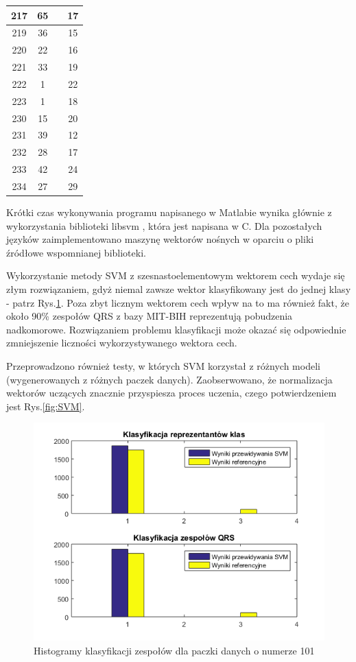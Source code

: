 \begin{table}[!tp]
\begin{tabular}{|c|c|c|c|}
		217 & 65 &  & 17\\ \hline
		219 & 36 &  & 15\\ \hline
		220 & 22 &  & 16\\ \hline	
		221 & 33 &  & 19\\ \hline
		222 &  1 &  & 22\\ \hline
		223 &  1 &  & 18\\ \hline
		230 & 15 &  & 20\\ \hline
		231 & 39 &  & 12\\ \hline
		232 & 28 &  & 17\\ \hline
		233 & 42 &  & 24\\ \hline
		234 & 27 &  & 29\\ \hline
	\end{tabular}
\end{table}

Krótki czas wykonywania programu napisanego w Matlabie wynika głównie z wykorzystania biblioteki libsvm \cite{csie}, która jest napisana w C. Dla pozostałych języków zaimplementowano maszynę wektorów nośnych w oparciu o pliki źródłowe wspomnianej biblioteki.

Wykorzystanie metody SVM z szesnastoelementowym wektorem cech wydaje się złym rozwiązaniem, gdyż niemal zawsze wektor klasyfikowany jest do jednej klasy - patrz Rys.\ref{fig:hist1}. Poza zbyt licznym wektorem cech wpływ na to ma również fakt, że około 90\% zespołów QRS z bazy MIT-BIH reprezentują pobudzenia nadkomorowe. Rozwiązaniem problemu klasyfikacji może okazać się odpowiednie zmniejszenie liczności wykorzystywanego wektora cech.

Przeprowadzono również testy, w których SVM korzystał z różnych modeli (wygenerowanych z różnych paczek danych). Zaobserwowano, że normalizacja wektorów uczących znacznie przyspiesza proces uczenia, czego potwierdzeniem jest Rys.\ref{fig:SVM}.

\begin{figure}[!htp]
	\centering
	\includegraphics[width=15cm]{Grafika/101_2_3}
	\caption{Histogramy klasyfikacji zespołów dla paczki danych o numerze 101}
	\label{fig:hist1}
\end{figure}

